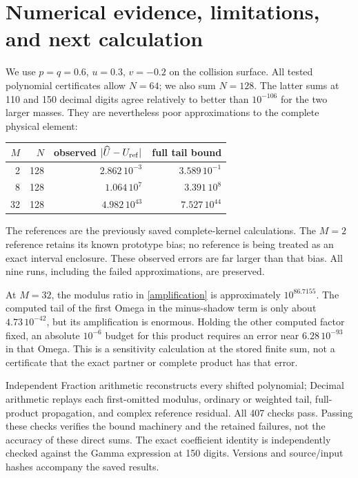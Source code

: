 \documentclass[11pt,a4paper]{article}
\begin{document}
\section{Numerical evidence, limitations, and next calculation}
We use $p=q=0.6$, $u=0.3$, $v=-0.2$ on the collision surface.
All tested polynomial certificates allow $N=64$; we also sum $N=128$.
The latter sums at 110 and 150 decimal digits agree relatively to
better than $10^{-106}$ for the two larger masses. They are nevertheless
poor approximations to the complete physical element:
\begin{center}
\begin{tabular}{rrrr}
\toprule
$M$ & $N$ & observed $|\widehat U-U_{\rm ref}|$ & full tail bound\\
\midrule
2 &128& $2.862\,10^{-3}$ & $3.589\,10^{-1}$\\
8 &128& $1.064\,10^{7}$ & $3.391\,10^{8}$\\
32&128& $4.982\,10^{43}$ & $7.527\,10^{44}$\\
\bottomrule
\end{tabular}
\end{center}
The references are the previously saved complete-kernel calculations.
The $M=2$ reference retains its known prototype bias; no reference is
being treated as an exact interval enclosure. These observed errors are
far larger than that bias. All nine runs, including the failed
approximations, are preserved.

At $M=32$, the modulus ratio in \eqref{amplification} is approximately
$10^{86.7155}$. The computed tail of the first Omega in the minus-shadow
term is only about $4.73\,10^{-42}$, but its amplification is enormous.
Holding the other computed factor fixed, an absolute $10^{-6}$ budget
for this product requires an error near $6.28\,10^{-93}$ in that Omega.
This is a sensitivity calculation at the stored finite sum, not a
certificate that the exact partner or complete product has that error.

Independent Fraction arithmetic reconstructs every shifted polynomial;
Decimal arithmetic replays each first-omitted modulus, ordinary or
weighted tail, full-product propagation, and complex reference residual.
All 407 checks pass. Passing these checks verifies the bound machinery
and the retained failures, not the accuracy of these direct sums.
The exact coefficient identity is independently checked against the
Gamma expression at 150 digits. Versions and source/input hashes
accompany the saved results.
\end{document}
